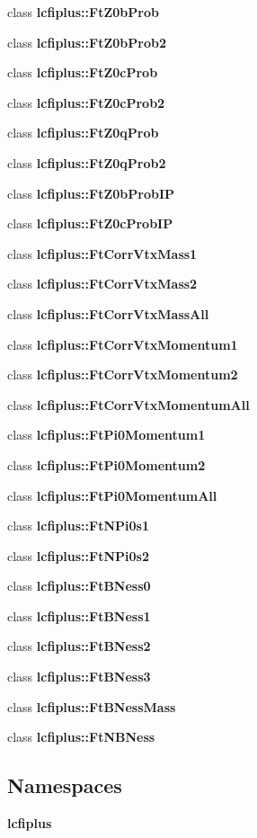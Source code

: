 \begin{DoxyCompactItemize}
\item 
class {\bf lcfiplus\-::\-Ft\-Z0b\-Prob}
\item 
class {\bf lcfiplus\-::\-Ft\-Z0b\-Prob2}
\item 
class {\bf lcfiplus\-::\-Ft\-Z0c\-Prob}
\item 
class {\bf lcfiplus\-::\-Ft\-Z0c\-Prob2}
\item 
class {\bf lcfiplus\-::\-Ft\-Z0q\-Prob}
\item 
class {\bf lcfiplus\-::\-Ft\-Z0q\-Prob2}
\item 
class {\bf lcfiplus\-::\-Ft\-Z0b\-Prob\-I\-P}
\item 
class {\bf lcfiplus\-::\-Ft\-Z0c\-Prob\-I\-P}
\item 
class {\bf lcfiplus\-::\-Ft\-Corr\-Vtx\-Mass1}
\item 
class {\bf lcfiplus\-::\-Ft\-Corr\-Vtx\-Mass2}
\item 
class {\bf lcfiplus\-::\-Ft\-Corr\-Vtx\-Mass\-All}
\item 
class {\bf lcfiplus\-::\-Ft\-Corr\-Vtx\-Momentum1}
\item 
class {\bf lcfiplus\-::\-Ft\-Corr\-Vtx\-Momentum2}
\item 
class {\bf lcfiplus\-::\-Ft\-Corr\-Vtx\-Momentum\-All}
\item 
class {\bf lcfiplus\-::\-Ft\-Pi0\-Momentum1}
\item 
class {\bf lcfiplus\-::\-Ft\-Pi0\-Momentum2}
\item 
class {\bf lcfiplus\-::\-Ft\-Pi0\-Momentum\-All}
\item 
class {\bf lcfiplus\-::\-Ft\-N\-Pi0s1}
\item 
class {\bf lcfiplus\-::\-Ft\-N\-Pi0s2}
\item 
class {\bf lcfiplus\-::\-Ft\-B\-Ness0}
\item 
class {\bf lcfiplus\-::\-Ft\-B\-Ness1}
\item 
class {\bf lcfiplus\-::\-Ft\-B\-Ness2}
\item 
class {\bf lcfiplus\-::\-Ft\-B\-Ness3}
\item 
class {\bf lcfiplus\-::\-Ft\-B\-Ness\-Mass}
\item 
class {\bf lcfiplus\-::\-Ft\-N\-B\-Ness}
\end{DoxyCompactItemize}
\subsection*{Namespaces}
\begin{DoxyCompactItemize}
\item 
{\bf lcfiplus}
\end{DoxyCompactItemize}
